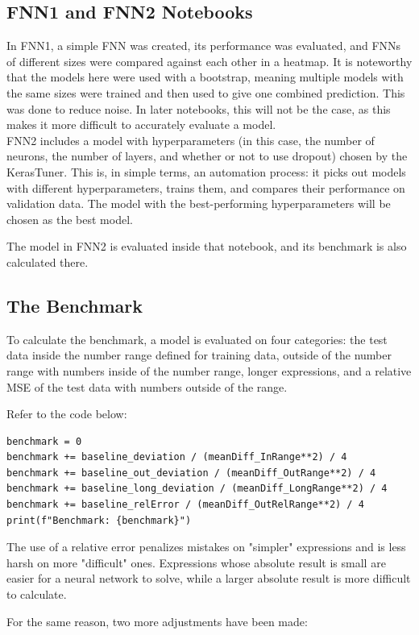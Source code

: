 \documentclass{article}
\begin{document}
\subsection{FNN1 and FNN2 Notebooks}
In FNN1, a simple FNN was created, its performance was evaluated, and FNNs of different sizes were compared against each other in a heatmap. It is noteworthy that the models here were used with a bootstrap, meaning multiple models with the same sizes were trained and then used to give one combined prediction. This was done to reduce noise. In later notebooks, this will not be the case, as this makes it more difficult to accurately evaluate a model.
\\[2em]
FNN2 includes a model with hyperparameters (in this case, the number of neurons, the number of layers, and whether or not to use dropout) chosen by the KerasTuner. This is, in simple terms, an automation process: it picks out models with different hyperparameters, trains them, and compares their performance on validation data. The model with the best-performing hyperparameters will be chosen as the best model.

The model in FNN2 is evaluated inside that notebook, and its benchmark is also calculated there.

\subsection{The Benchmark}
To calculate the benchmark, a model is evaluated on four categories: the test data inside the number range defined for training data, outside of the number range with numbers inside of the number range, longer expressions, and a relative MSE of the test data with numbers outside of the range.

Refer to the code below:
\begin{Verbatim}
benchmark = 0
benchmark += baseline_deviation / (meanDiff_InRange**2) / 4
benchmark += baseline_out_deviation / (meanDiff_OutRange**2) / 4
benchmark += baseline_long_deviation / (meanDiff_LongRange**2) / 4
benchmark += baseline_relError / (meanDiff_OutRelRange**2) / 4
print(f"Benchmark: {benchmark}")
\end{Verbatim}

The use of a relative error penalizes mistakes on "simpler" expressions and is less harsh on more "difficult" ones. Expressions whose absolute result is small are easier for a neural network to solve, while a larger absolute result is more difficult to calculate.

For the same reason, two more adjustments have been made: 
\end{document}
